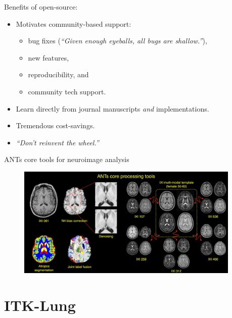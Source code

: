 \documentclass[ignorenonframetext,]{beamer}
\providecommand{\tightlist}{%
  \setlength{\itemsep}{0pt}\setlength{\parskip}{0pt}}
\begin{document}
\begin{frame}{Benefits of open-source:}

\begin{itemize}
\tightlist
\item
  Motivates community-based support:

  \begin{itemize}
  \tightlist
  \item
    bug fixes (\emph{``Given enough eyeballs, all bugs are shallow.''}),
  \item
    new features,
  \item
    reproducibility, and
  \item
    community tech support.
  \end{itemize}
\item
  Learn directly from journal manuscripts \emph{and} implementations.
\item
  Tremendous cost-savings.
\item
  \emph{``Don't reinvent the wheel.''}
\end{itemize}

\end{frame}

\begin{frame}{ANTs core tools for neuroimage analysis}

\centering

\begin{figure}
\includegraphics[width=0.95\textwidth]{../Figs/coreANtsToolsNeuro.png}
\end{figure}

\end{frame}

\section{ITK-Lung}\label{itk-lung}
\end{document}
